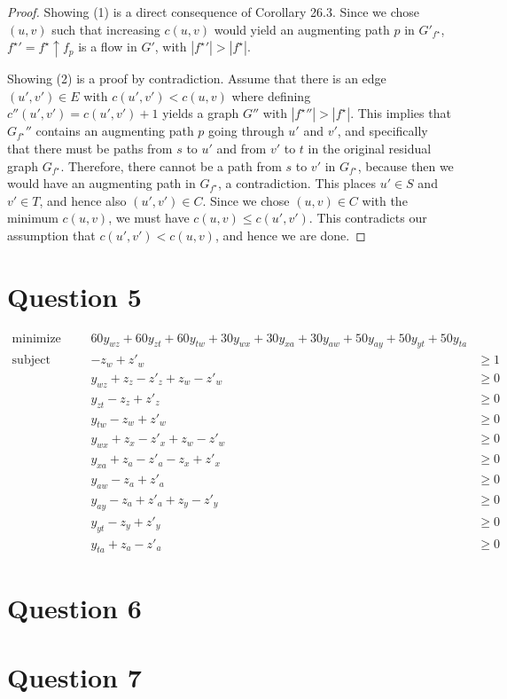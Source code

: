 \documentclass[a4paper, 10pt, oneside, article]{memoir}
\begin{document}
\begin{proof}
  Showing (1) is a direct consequence of Corollary 26.3. Since we
  chose $(u,v)$ such that increasing $c(u,v)$ would yield an
  augmenting path $p$ in $G'_{f^\star}$, ${f^\star}' = f^\star
  \uparrow f_p$ is a flow in $G'$, with $|{f^\star}'| > |f^\star|$.

  Showing (2) is a proof by contradiction. Assume that there is an
  edge $(u', v') \in E$ with $c(u',v') < c(u,v)$ where defining
  $c''(u', v') = c(u',v')+1$ yields a graph $G''$ with $|{f^\star}''|
  > |f^\star|$. This implies that $G_{f^\star}''$ contains an
  augmenting path $p$ going through $u'$ and $v'$, and specifically
  that there must be paths from $s$ to $u'$ and from $v'$ to $t$ in
  the original residual graph $G_{f^\star}$. Therefore, there cannot
  be a path from $s$ to $v'$ in $G_{f^\star}$, because then we would
  have an augmenting path in $G_{f^\star}$, a contradiction. This
  places $u' \in S$ and $v' \in T$, and hence also $(u', v') \in
  C$. Since we chose $(u,v) \in C$ with the minimum $c(u,v)$, we must
  have $c(u,v) \leq c(u', v')$. This contradicts our assumption that
  $c(u', v') < c(u,v)$, and hence we are done.
\end{proof}

\section*{Question 5}

\begin{align*}
\text{minimize}   &&& 60y_{wz} + 60y_{zt} + 60y_{tw} + 30y_{wx} + 30y_{xa} + 30y_{aw} + 50y_{ay} + 50y_{yt} + 50y_{ta}  \\
\text{subject to} &&& -z_{w}+  z'_{w} &\geq 1 \\
                  &&& y_{wz}+  z_{z}  -z'_{z}+  z_{w}  -z'_{w} &\geq 0 \\
                  &&& y_{zt}  -z_{z}+  z'_{z}&\geq 0 \\
                  &&& y_{tw}  -z_{w}+  z'_{w}&\geq 0 \\
                  &&& y_{wx}+  z_{x}  -z'_{x}+  z_{w}  -z'_{w}&\geq 0 \\
                  &&& y_{xa}+  z_{a}  -z'_{a}  -z_{x}+  z'_{x}&\geq 0 \\
                  &&& y_{aw}  -z_{a}+  z'_{a}&\geq 0 \\
                  &&& y_{ay}  -z_{a}+  z'_{a}+  z_{y}  -z'_{y}&\geq 0 \\
                  &&& y_{yt}  -z_{y}+  z'_{y}&\geq 0 \\
                  &&& y_{ta}+  z_{a}  -z'_{a}&\geq 0
\end{align*}


\section*{Question 6}


\section*{Question 7}



\end{document}
